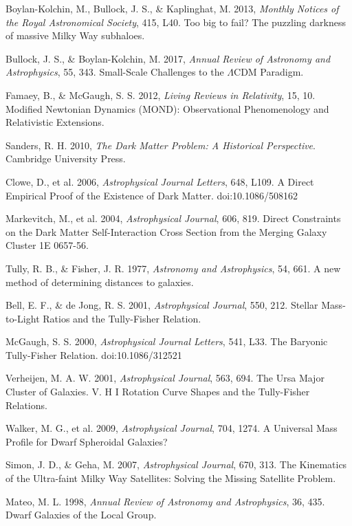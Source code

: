 \documentclass[12pt,a4paper]{article}
\begin{document}
\begin{thebibliography}{99}
 Boylan-Kolchin, M., Bullock, J. S., \& Kaplinghat, M. 2013, \textit{Monthly Notices of the Royal Astronomical Society}, 415, L40. Too big to fail? The puzzling darkness of massive Milky Way subhaloes.

 Bullock, J. S., \& Boylan-Kolchin, M. 2017, \textit{Annual Review of Astronomy and Astrophysics}, 55, 343. Small-Scale Challenges to the $\Lambda$CDM Paradigm.

 Famaey, B., \& McGaugh, S. S. 2012, \textit{Living Reviews in Relativity}, 15, 10. Modified Newtonian Dynamics (MOND): Observational Phenomenology and Relativistic Extensions.

 Sanders, R. H. 2010, \textit{The Dark Matter Problem: A Historical Perspective}. Cambridge University Press.

 Clowe, D., et al. 2006, \textit{Astrophysical Journal Letters}, 648, L109. A Direct Empirical Proof of the Existence of Dark Matter. doi:10.1086/508162

 Markevitch, M., et al. 2004, \textit{Astrophysical Journal}, 606, 819. Direct Constraints on the Dark Matter Self-Interaction Cross Section from the Merging Galaxy Cluster 1E 0657-56.

 Tully, R. B., \& Fisher, J. R. 1977, \textit{Astronomy and Astrophysics}, 54, 661. A new method of determining distances to galaxies.

 Bell, E. F., \& de Jong, R. S. 2001, \textit{Astrophysical Journal}, 550, 212. Stellar Mass-to-Light Ratios and the Tully-Fisher Relation.

 McGaugh, S. S. 2000, \textit{Astrophysical Journal Letters}, 541, L33. The Baryonic Tully-Fisher Relation. doi:10.1086/312521

 Verheijen, M. A. W. 2001, \textit{Astrophysical Journal}, 563, 694. The Ursa Major Cluster of Galaxies. V. H I Rotation Curve Shapes and the Tully-Fisher Relations.

 Walker, M. G., et al. 2009, \textit{Astrophysical Journal}, 704, 1274. A Universal Mass Profile for Dwarf Spheroidal Galaxies?

 Simon, J. D., \& Geha, M. 2007, \textit{Astrophysical Journal}, 670, 313. The Kinematics of the Ultra-faint Milky Way Satellites: Solving the Missing Satellite Problem.

 Mateo, M. L. 1998, \textit{Annual Review of Astronomy and Astrophysics}, 36, 435. Dwarf Galaxies of the Local Group.


\end{thebibliography}
\end{document}
